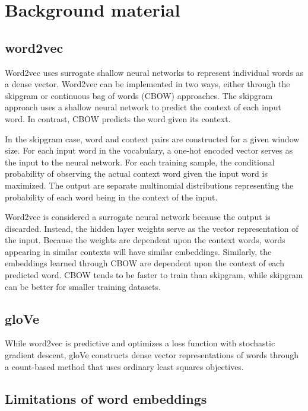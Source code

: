 \section{\label{sec:level3} Background material}

\subsection{word2vec}

Word2vec \cite{word2vec} uses surrogate shallow neural networks to represent individual words as a dense vector. Word2vec can be implemented in two ways, either through the skipgram or continuous bag of words (CBOW) approaches. The skipgram approach uses a shallow neural network to predict the context of each input word. In contrast, CBOW predicts the word given its context. 

In the skipgram case, word and context pairs are constructed for a given window size. For each input word in the vocabulary, a one-hot encoded vector serves as the input to the neural network. For each training sample, the conditional probability of observing the actual context word given the input word is maximized. The output are separate multinomial distributions representing the probability of each word being in the context of the input.

Word2vec is considered a surrogate neural network because the output is discarded. Instead, the hidden layer weights serve as the vector representation of the input. Because the weights are dependent upon the context words, words appearing in similar contexts will have similar embeddings. Similarly, the embeddings learned through CBOW are dependent upon the context of each predicted word. CBOW tends to be faster to train than skipgram, while skipgram can be better for smaller training datasets.

\subsection{gloVe}

While word2vec is predictive and optimizes a loss function with stochastic gradient descent, gloVe constructs dense vector representations of words through a count-based method that uses ordinary least squares objectives.

\subsection{Limitations of word embeddings}

